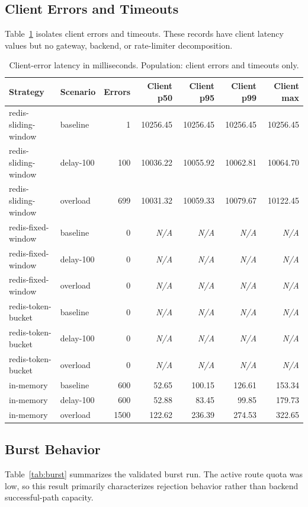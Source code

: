 \documentclass[conference]{IEEEtran}
\newcommand{\na}{\textit{N/A}}
\begin{document}
\subsection{Client Errors and Timeouts}
Table~\ref{tab:errors} isolates client errors and timeouts. These records have client latency values but no gateway, backend, or rate-limiter decomposition.

\begin{table}[t]
\centering
\scriptsize
\caption{Client-error latency in milliseconds. Population: client errors and timeouts only.}
\label{tab:errors}
\begin{tabular}{llrrrrr}
\hline
Strategy & Scenario & Errors & Client p50 & Client p95 & Client p99 & Client max \\
\hline
redis-sliding-window & baseline & 1 & 10256.45 & 10256.45 & 10256.45 & 10256.45 \\
redis-sliding-window & delay-100 & 100 & 10036.22 & 10055.92 & 10062.81 & 10064.70 \\
redis-sliding-window & overload & 699 & 10031.32 & 10059.33 & 10079.67 & 10122.45 \\
redis-fixed-window & baseline & 0 & \na & \na & \na & \na \\
redis-fixed-window & delay-100 & 0 & \na & \na & \na & \na \\
redis-fixed-window & overload & 0 & \na & \na & \na & \na \\
redis-token-bucket & baseline & 0 & \na & \na & \na & \na \\
redis-token-bucket & delay-100 & 0 & \na & \na & \na & \na \\
redis-token-bucket & overload & 0 & \na & \na & \na & \na \\
in-memory & baseline & 600 & 52.65 & 100.15 & 126.61 & 153.34 \\
in-memory & delay-100 & 600 & 52.88 & 83.45 & 99.85 & 179.73 \\
in-memory & overload & 1500 & 122.62 & 236.39 & 274.53 & 322.65 \\
\hline
\end{tabular}
\end{table}

\subsection{Burst Behavior}
Table~\ref{tab:burst} summarizes the validated burst run. The active route quota was low, so this result primarily characterizes rejection behavior rather than backend successful-path capacity.
\end{document}

